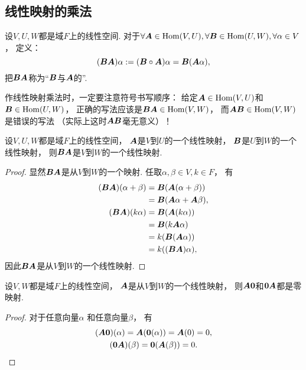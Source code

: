 \subsection{线性映射的乘法}
\begin{definition}
设\(V,U,W\)都是域\(F\)上的线性空间.
对于\(\forall\boldsymbol{A}\in\operatorname{Hom}(V,U),
\forall\boldsymbol{B}\in\operatorname{Hom}(U,W),
\forall\alpha \in V\)，
定义：\begin{equation*}
	(\boldsymbol{B}\boldsymbol{A})\alpha
	:= (\boldsymbol{B} \circ \boldsymbol{A})\alpha
	= \boldsymbol{B}(\boldsymbol{A}\alpha),
\end{equation*}
把\(\boldsymbol{B}\boldsymbol{A}\)称为“\(\boldsymbol{B}\)与\(\boldsymbol{A}\)的”.
\end{definition}
\begin{remark}
作线性映射乘法时，一定要注意符号书写顺序：
给定\(\boldsymbol{A} \in \operatorname{Hom}(V,U)\)和\(\boldsymbol{B} \in \operatorname{Hom}(U,W)\)，
正确的写法应该是\(\boldsymbol{B} \boldsymbol{A} \in \operatorname{Hom}(V,W)\)，
而\(\boldsymbol{A} \boldsymbol{B} \in \operatorname{Hom}(V,W)\)是错误的写法
（实际上这时\(\boldsymbol{A} \boldsymbol{B}\)毫无意义）！
\end{remark}

\begin{proposition}
设\(V,U,W\)都是域\(F\)上的线性空间，
\(\boldsymbol{A}\)是\(V\)到\(U\)的一个线性映射，
\(\boldsymbol{B}\)是\(U\)到\(W\)的一个线性映射，
则\(\boldsymbol{B}\boldsymbol{A}\)是\(V\)到\(W\)的一个线性映射.
\begin{proof}
显然\(\boldsymbol{B}\boldsymbol{A}\)是从\(V\)到\(W\)的一个映射.
任取\(\alpha,\beta \in V,
k \in F\)，
有\begin{align*}
	(\boldsymbol{B}\boldsymbol{A})(\alpha+\beta)
	&= \boldsymbol{B}(\boldsymbol{A}(\alpha+\beta)) \\
	&= \boldsymbol{B}(\boldsymbol{A}\alpha+\boldsymbol{A}\beta), \\
	(\boldsymbol{B}\boldsymbol{A})(k\alpha)
	&= \boldsymbol{B}(\boldsymbol{A}(k \alpha)) \\
	&= \boldsymbol{B}(k \boldsymbol{A}\alpha) \\
	&= k(\boldsymbol{B}(\boldsymbol{A}\alpha)) \\
	&= k((\boldsymbol{B}\boldsymbol{A}) \alpha),
\end{align*}
因此\(\boldsymbol{B}\boldsymbol{A}\)是从\(V\)到\(W\)的一个线性映射.
\end{proof}
\end{proposition}

\begin{proposition}\label{theorem:线性映射.零映射与任意线性映射之积是零映射}
设\(V,W\)都是域\(F\)上的线性空间，
\(\boldsymbol{A}\)是从\(V\)到\(W\)的一个线性映射，
则\(\boldsymbol{A}\boldsymbol0\)和\(\boldsymbol0\boldsymbol{A}\)都是零映射.
\begin{proof}
对于任意向量\(\alpha\)
和任意向量\(\beta\)，
有\begin{gather*}
	(\boldsymbol{A}\boldsymbol0)(\alpha)
	= \boldsymbol{A}(\boldsymbol0(\alpha))
	= \boldsymbol{A}(0)
	= 0, \\
	(\boldsymbol0\boldsymbol{A})(\beta)
	= \boldsymbol0(\boldsymbol{A}(\beta))
	= 0.
	\qedhere
\end{gather*}
\end{proof}
\end{proposition}

